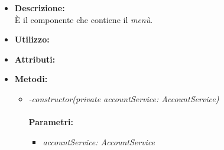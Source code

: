 \begin{itemize}
	\item \textbf{Descrizione:}\\
	È il componente che contiene il \textit{menù}.
	\item \textbf{Utilizzo:}\\
	
	\item \textbf{Attributi:}
		
	\item \textbf{Metodi:}
		\begin{itemize}
			\item \emph{-constructor(private accountService: AccountService)}\\
    		\\
    		\textbf{Parametri:}
    		\begin{itemize}
    		
    			\item \emph{accountService: AccountService}\\
    			
    		\end{itemize}
		\end{itemize}
\end{itemize}